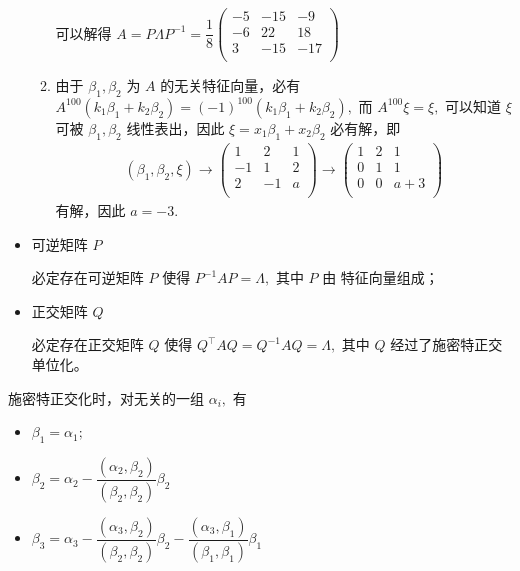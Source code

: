 \begin{itemize}
\begin{enumerate}[label = \Roman*.]
        可以解得 $ A = P\Lambda P^{-1} = \dfrac{1}{8}\begin{pmatrix}
            -5&-15&-9\\-6&22&18\\3&-15&-17\\
        \end{pmatrix} $ 
        \item 由于 $ \beta_1,\beta_2 $ 为 $ A $ 的无关特征向量，必有
        $ A^{100}(k_1\beta_1+k_2\beta_2) = (-1)^{100}(k_1\beta_1+k_2\beta_2), $ 
        而 $ A^{100}\xi = \xi, $ 可以知道 $ \xi $ 可被 $ \beta_1,\beta_2 $ 线性表出，因此
        $ \xi = x_1\beta_1+x_2\beta_2 $ 必有解，即
        \begin{equation*}
            \begin{aligned}
                (\beta_1,\beta_2,\xi)\rightarrow\begin{pmatrix}
                    1&2&1\\-1&1&2\\2&-1&a\\
                \end{pmatrix}\rightarrow\begin{pmatrix}
                    1&2&1\\0&1&1\\0&0&a+3\\
                \end{pmatrix}
            \end{aligned}
        \end{equation*}
        有解，因此 $ a = -3. $ 
    \end{enumerate}
\end{itemize}



\begin{itemize}
    \item 可逆矩阵 $ P $ 
    
    必定存在可逆矩阵 $ P $ 使得 $ P^{-1}AP = \Lambda, $ 其中 $ P $ 由
    特征向量组成；
    \item 正交矩阵 $ Q $ 
    
    必定存在正交矩阵 $ Q $ 使得 $ Q^\top AQ =  Q^{-1}AQ = \Lambda, $ 
    其中 $ Q $ 经过了施密特正交单位化。
\end{itemize}

施密特正交化时，对无关的一组 $ \alpha_i, $ 有
\begin{itemize}
    \item $ \beta_1 = \alpha_1; $ 
    \item $ \beta_2 = \alpha_2 - \dfrac{(\alpha_2,\beta_2)}{(\beta_2,\beta_2)}\beta_2 $ 
    \item $ \beta_3 = \alpha_3 - 
    \dfrac{(\alpha_3,\beta_2)}{(\beta_2,\beta_2)}\beta_2-
    \dfrac{(\alpha_3,\beta_1)}{(\beta_1,\beta_1)}\beta_1 $ 
\end{itemize}


